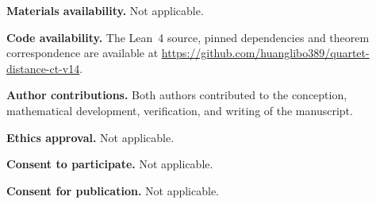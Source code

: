 \documentclass[12pt]{article}
\begin{document}
\noindent\textbf{Materials availability.}
Not applicable.

\noindent\textbf{Code availability.}
The Lean~4 source, pinned dependencies and theorem correspondence
are available at
\url{https://github.com/huanglibo389/quartet-distance-ct-v14}.

\noindent\textbf{Author contributions.}
Both authors contributed to the conception, mathematical development,
verification, and writing of the manuscript.

\noindent\textbf{Ethics approval.}
Not applicable.

\noindent\textbf{Consent to participate.}
Not applicable.

\noindent\textbf{Consent for publication.}
Not applicable.



\end{document}

